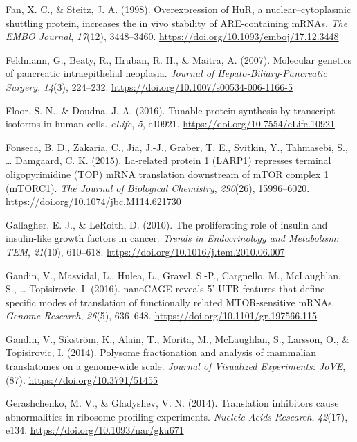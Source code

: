 \documentclass[12pt,openany]{book}
\begin{document}
\hypertarget{ref-Fan1998}{}
Fan, X. C., \& Steitz, J. A. (1998). Overexpression of HuR, a
nuclear--cytoplasmic shuttling protein, increases the in vivo stability
of ARE-containing mRNAs. \emph{The EMBO Journal}, \emph{17}(12),
3448--3460. \url{https://doi.org/10.1093/emboj/17.12.3448}

\hypertarget{ref-Feldmann2007}{}
Feldmann, G., Beaty, R., Hruban, R. H., \& Maitra, A. (2007). Molecular
genetics of pancreatic intraepithelial neoplasia. \emph{Journal of
Hepato-Biliary-Pancreatic Surgery}, \emph{14}(3), 224--232.
\url{https://doi.org/10.1007/s00534-006-1166-5}

\hypertarget{ref-Floor2016}{}
Floor, S. N., \& Doudna, J. A. (2016). Tunable protein synthesis by
transcript isoforms in human cells. \emph{eLife}, \emph{5}, e10921.
\url{https://doi.org/10.7554/eLife.10921}

\hypertarget{ref-Fonseca2015}{}
Fonseca, B. D., Zakaria, C., Jia, J.-J., Graber, T. E., Svitkin, Y.,
Tahmasebi, S., \ldots{} Damgaard, C. K. (2015). La-related protein 1
(LARP1) represses terminal oligopyrimidine (TOP) mRNA translation
downstream of mTOR complex 1 (mTORC1). \emph{The Journal of Biological
Chemistry}, \emph{290}(26), 15996--6020.
\url{https://doi.org/10.1074/jbc.M114.621730}

\hypertarget{ref-Gallagher2010}{}
Gallagher, E. J., \& LeRoith, D. (2010). The proliferating role of
insulin and insulin-like growth factors in cancer. \emph{Trends in
Endocrinology and Metabolism: TEM}, \emph{21}(10), 610--618.
\url{https://doi.org/10.1016/j.tem.2010.06.007}

\hypertarget{ref-Gandin2016a}{}
Gandin, V., Masvidal, L., Hulea, L., Gravel, S.-P., Cargnello, M.,
McLaughlan, S., \ldots{} Topisirovic, I. (2016). nanoCAGE reveals 5' UTR
features that define specific modes of translation of functionally
related MTOR-sensitive mRNAs. \emph{Genome Research}, \emph{26}(5),
636--648. \url{https://doi.org/10.1101/gr.197566.115}

\hypertarget{ref-Gandin2014}{}
Gandin, V., Sikström, K., Alain, T., Morita, M., McLaughlan, S.,
Larsson, O., \& Topisirovic, I. (2014). Polysome fractionation and
analysis of mammalian translatomes on a genome-wide scale. \emph{Journal
of Visualized Experiments: JoVE}, (87).
\url{https://doi.org/10.3791/51455}

\hypertarget{ref-Gerashchenko2014}{}
Gerashchenko, M. V., \& Gladyshev, V. N. (2014). Translation inhibitors
cause abnormalities in ribosome profiling experiments. \emph{Nucleic
Acids Research}, \emph{42}(17), e134.
\url{https://doi.org/10.1093/nar/gku671}
\end{document}
